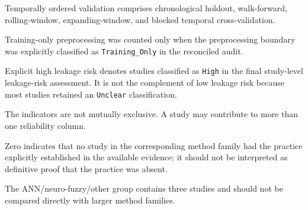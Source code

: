 \begin{landscape}
\begin{table}[!p]
\begin{minipage}{\linewidth}
Temporally ordered validation comprises chronological holdout, walk-forward, rolling-window, expanding-window, and blocked temporal cross-validation.

Training-only preprocessing was counted only when the preprocessing boundary was explicitly classified as \texttt{Training\_Only} in the reconciled audit.

Explicit high leakage risk denotes studies classified as \texttt{High} in the final study-level leakage-risk assessment. It is not the complement of low leakage risk because most studies retained an \texttt{Unclear} classification.

The indicators are not mutually exclusive. A study may contribute to more than one reliability column.

Zero indicates that no study in the corresponding method family had the practice explicitly established in the available evidence; it should not be interpreted as definitive proof that the practice was absent.

The ANN/neuro-fuzzy/other group contains three studies and should not be compared directly with larger method families.
\end{minipage}
\end{table}
\end{landscape}
